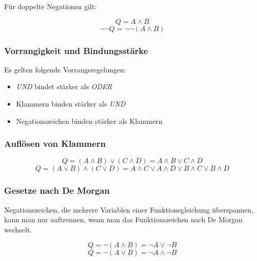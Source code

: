\documentclass[a4paper, 12pt]{report}
\begin{document}
\begin{multicols}{2}
Für doppelte Negationen gilt:

\begin{center}
    \begin{equation}
	Q = A \land B
    \end{equation}
    \begin{equation}
	\neg \neg Q = \neg \neg (A \land B)
    \end{equation}
\end{center}

\subsubsection{Vorrangigkeit und Bindungsstärke}

Es gelten folgende Vorrangsregelungen:
\begin{itemize}
    \item \emph{UND} bindet stärker als \emph{ODER}
    \item Klammern binden stärker als \emph{UND}
    \item Negationszeichen binden stärker als Klammern
\end{itemize}

\subsubsection{Auflösen von Klammern}
\begin{center}
    \begin{equation}
	Q = (A \land B) \lor (C \land D) = A \land B \lor C \land D
    \end{equation}
    \begin{equation}
	Q = (A \lor B) \land (C \lor D) = A \land C \lor A \land D \lor B \land
	C \lor B \land D
    \end{equation}
\end{center}

\subsubsection{Gesetze nach De Morgan}

Negationszeichen, die mehrere Variablen einer Funktionsgleichung überspannen,
kann man nur auftrennen, wenn man das Funktionszeichen nach De Morgan wechselt.

\begin{center}
    \begin{equation}
	Q = \neg (A \land B) = \neg A \lor \neg B
    \end{equation}
    \begin{equation}
	Q = \neg (A \lor B) = \neg A \land \neg B
    \end{equation}
\end{center}


\end{multicols}
\end{document}
